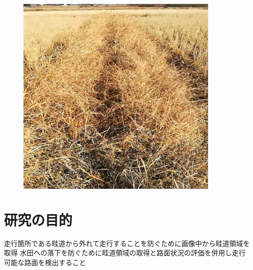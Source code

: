 \begin{figure}[htbp]
\begin{center}
\includegraphics[width=100mm]{figs/fig2.jpg}
\caption{}
\end{center}
\end{figure}

\section{研究の目的}
走行箇所である畦道から外れて走行することを防ぐために画像中から畦道領域を取得
水田への落下を防ぐために畦道領域の取得と路面状況の評価を併用し走行可能な路面を検出すること


%
